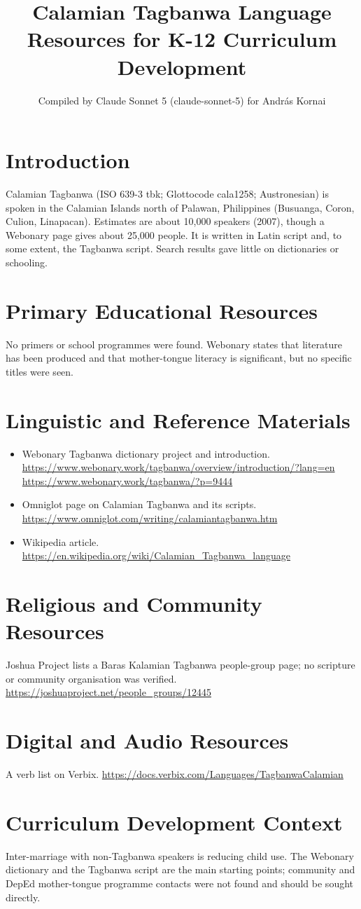 \documentclass[12pt]{article}
\title{Calamian Tagbanwa Language Resources for K-12 Curriculum Development}
\author{Compiled by Claude Sonnet 5 (claude-sonnet-5) for Andr\'as Kornai}
\date{}
\begin{document}
\maketitle
\section{Introduction}
Calamian Tagbanwa (ISO 639-3 tbk; Glottocode cala1258; Austronesian) is spoken in the Calamian Islands north of Palawan, Philippines (Busuanga, Coron, Culion, Linapacan). Estimates are about 10,000 speakers (2007), though a Webonary page gives about 25,000 people. It is written in Latin script and, to some extent, the Tagbanwa script. Search results gave little on dictionaries or schooling.
\section{Primary Educational Resources}
No primers or school programmes were found. Webonary states that literature has been produced and that mother-tongue literacy is significant, but no specific titles were seen.
\section{Linguistic and Reference Materials}
\begin{itemize}
\item Webonary Tagbanwa dictionary project and introduction. \url{https://www.webonary.work/tagbanwa/overview/introduction/?lang=en} \quad \url{https://www.webonary.work/tagbanwa/?p=9444}
\item Omniglot page on Calamian Tagbanwa and its scripts. \url{https://www.omniglot.com/writing/calamiantagbanwa.htm}
\item Wikipedia article. \url{https://en.wikipedia.org/wiki/Calamian_Tagbanwa_language}
\end{itemize}
\section{Religious and Community Resources}
Joshua Project lists a Baras Kalamian Tagbanwa people-group page; no scripture or community organisation was verified. \url{https://joshuaproject.net/people_groups/12445}
\section{Digital and Audio Resources}
A verb list on Verbix. \url{https://docs.verbix.com/Languages/TagbanwaCalamian}
\section{Curriculum Development Context}
Inter-marriage with non-Tagbanwa speakers is reducing child use. The Webonary dictionary and the Tagbanwa script are the main starting points; community and DepEd mother-tongue programme contacts were not found and should be sought directly.
\end{document}
